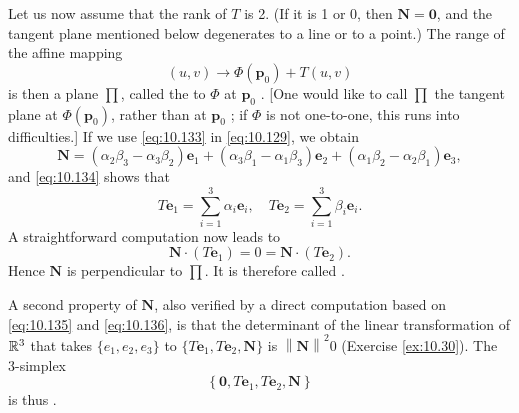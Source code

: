 \begin{mydef}
    Let us now assume that the rank of $T$ is 2. 
    (If it is 1 or 0, then $\mathbf{N} = \mathbf{0}$, 
    and the tangent plane mentioned below degenerates to a line or to a point.) 
    The range of the affine mapping
    \begin{equation}
        (u,v) \rightarrow \Phi(\mathbf{p}_0) + T(u,v)
    \end{equation}
    is then a plane $\prod$, called the  to $\Phi$ at $\mathbf{p}_0$ . 
    [One would like to call $\prod$ the tangent plane at $\Phi(\mathbf{p}_0)$, rather than at $\mathbf{p}_0$ ; 
    if $\Phi$ is not one-to-one, this runs into difficulties.]
    If we use \eqref{eq:10.133} in \eqref{eq:10.129}, we obtain
    \begin{equation}
        \label{eq:10.135}
        \mathbf{N} = 
        \left( \alpha_2 \beta_3 - \alpha_3 \beta_2 \right) \mathbf{e}_1 +
        \left( \alpha_3 \beta_1 - \alpha_1 \beta_3 \right) \mathbf{e}_2 +
        \left( \alpha_1 \beta_2 - \alpha_2 \beta_1 \right) \mathbf{e}_3 ,
    \end{equation}
    and \eqref{eq:10.134} shows that 
    \begin{equation}
        \label{eq:10.136}
        T \mathbf{e}_1 = \sum_{i=1}^{3} \alpha_i \mathbf{e}_i ,
        \quad 
        T \mathbf{e}_2 = \sum_{i=1}^{3} \beta_i \mathbf{e}_i .
    \end{equation}
    A straightforward computation now leads to
    \begin{equation}
        \label{eq:10.137}
        \mathbf{N}\cdot (T \mathbf{e}_1) = 0 =
        \mathbf{N}\cdot (T \mathbf{e}_2) .
    \end{equation}
    Hence $\mathbf{N}$ is perpendicular to $\prod$. 
    It is therefore called  .

    A second property of $\mathbf{N}$, also verified by a direct computation based on \eqref{eq:10.135} and \eqref{eq:10.136}, is that the determinant of the linear transformation of ${\protect\mathbb R}^3$ that takes $\{e_1, e_2 , e_3\}$ to $\{T\mathbf{e}_1, T\mathbf{e}_2 , \mathbf{N}\}$ is $\left\| \mathbf{N} \right\|^2 0$ (Exercise \ref{ex:10.30}). The 3-simplex
    \begin{equation}
        \label{eq:10.138}
        \left\{ \mathbf{0}, T\mathbf{e}_1, T\mathbf{e}_2, \mathbf{N} \right\}
    \end{equation}
    is thus .


\end{mydef}
